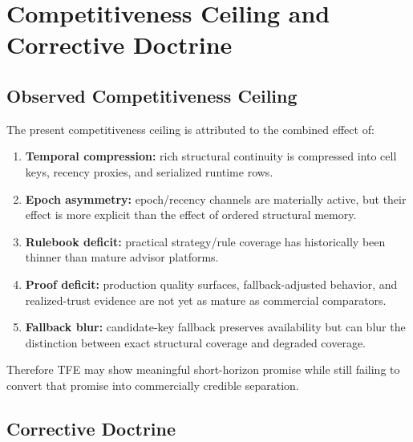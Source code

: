 \chapter{Competitiveness Ceiling and Corrective Doctrine}
\section{Observed Competitiveness Ceiling}

The present competitiveness ceiling is attributed to the combined effect of:
\begin{enumerate}[leftmargin=1.2cm]
    \item \textbf{Temporal compression:} rich structural continuity is compressed into cell keys, recency proxies, and serialized runtime rows.
    \item \textbf{Epoch asymmetry:} epoch/recency channels are materially active, but their effect is more explicit than the effect of ordered structural memory.
    \item \textbf{Rulebook deficit:} practical strategy/rule coverage has historically been thinner than mature advisor platforms.
    \item \textbf{Proof deficit:} production quality surfaces, fallback-adjusted behavior, and realized-trust evidence are not yet as mature as commercial comparators.
    \item \textbf{Fallback blur:} candidate-key fallback preserves availability but can blur the distinction between exact structural coverage and degraded coverage.
\end{enumerate}
Therefore TFE may show meaningful short-horizon promise while still failing to convert that promise into commercially credible separation.

\section{Corrective Doctrine}

